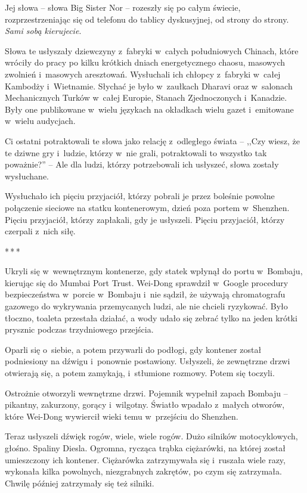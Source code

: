 \documentclass[oneside,polish,11pt,rmheadings]{mwbk}
\newcommand{\threeast}{\par\centerline{*\,*\,*}\medskip\par}
\begin{document}
Jej słowa -- słowa Big  Sister Nor -- rozeszły się po całym świecie, rozprzestrzeniając się od telefonu do tablicy dyskusyjnej, od strony do strony. \textit{Sami sobą kierujecie}.

Słowa te usłyszały dziewczyny z~fabryki w~całych południowych Chinach, które wróciły do pracy po kilku krótkich dniach energetycznego chaosu, masowych zwolnień i~masowych aresztowań. Wysłuchali ich chłopcy z~fabryki w~całej Kambodży i~Wietnamie. Słychać je było w~zaułkach Dharavi oraz w~salonach Mechanicznych Turków w~całej Europie, Stanach Zjednoczonych i~Kanadzie. Były one publikowane w~wielu językach na okładkach wielu gazet i~emitowane w~wielu audycjach.

Ci ostatni potraktowali te słowa jako relację z~odległego świata -- ,,Czy wiesz, że te dziwne gry i~ludzie, którzy w~nie grali, potraktowali to wszystko tak poważnie?'' -- Ale dla ludzi, którzy potrzebowali ich usłyszeć, słowa zostały wysłuchane.

Wysłuchało ich pięciu przyjaciół, którzy pobrali je przez boleśnie powolne połączenie sieciowe na statku kontenerowym, dzień poza portem w~Shenzhen. Pięciu przyjaciół, którzy zapłakali, gdy je usłyszeli. Pięciu przyjaciół, którzy czerpali z~nich siłę.

\bigskip
\threeast

Ukryli się w~wewnętrznym kontenerze, gdy statek wpłynął do portu w~Bombaju, kierując się do Mumbai Port Trust. Wei-Dong sprawdził w~Google procedury bezpieczeństwa w~porcie w~Bombaju i~nie sądził, że używają chromatografu gazowego do wykrywania przemycanych ludzi, ale nie chcieli ryzykować. Było tłoczno, toaleta przestała działać, a wody udało się zebrać tylko na jeden krótki prysznic podczas trzydniowego przejścia.

Oparli się o~siebie, a potem przywarli do podłogi, gdy kontener został podniesiony na dźwigu i~ponownie postawiony. Usłyszeli, że zewnętrzne drzwi otwierają się, a potem zamykają, i~stłumione rozmowy. Potem się toczyli.

Ostrożnie otworzyli wewnętrzne drzwi. Pojemnik wypełnił zapach Bombaju -- pikantny, zakurzony, gorący i~wilgotny. Światło wpadało z~małych otworów, które Wei-Dong wywiercił wieki temu w~przejściu do Shenzhen.

Teraz usłyszeli dźwięk rogów, wiele, wiele rogów. Dużo silników motocyklowych, głośno. Spaliny Diesla. Ogromna, rycząca trąbka ciężarówki, na której został umieszczony ich kontener. Ciężarówka zatrzymywała się i~ruszała wiele razy, wykonała kilka powolnych, niezgrabnych zakrętów, po czym się zatrzymała. Chwilę później zatrzymały się też silniki.
\end{document}
